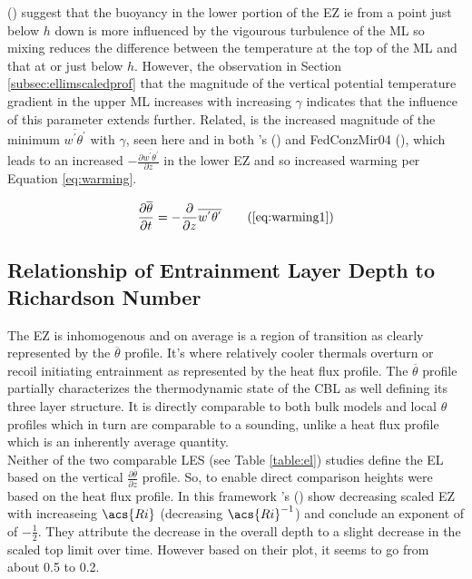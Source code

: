\citeauthor{GarciaMellado} (\cite{GarciaMellado}) suggest that the buoyancy in the lower portion of the \acs{EZ} ie from a point just below $h$ down is more influenced by the vigourous turbulence of the \acs{ML} so mixing reduces the difference between the temperature at the top of the \acs{ML} and that at or just below $h$.  However, the observation in Section \ref{subsec:ellimscaledprof} that the magnitude of the vertical potential temperature gradient in the upper \acs{ML} increases with increasing $\gamma$ indicates that the influence of this parameter extends further.  Related, is the increased magnitude of the minimum $\overline{w^{'}\theta^{'}}$ with $\gamma$, seen here and in both \citeauthor{Sorbjan}'s (\citeyear{Sorbjan}) and {FedConzMir04} (\citeyear{FedConzMir04}), which leads to an increased $-\frac{\partial \overline{w^{'}\theta^{'}}}{\partial z}$ in the lower \acs{EZ} and so increased warming per Equation \ref{eq:warming}.

\begin{equation}
\frac{\partial \overline{\theta}}{\partial t} = -\frac{\partial}{\partial z}\overline{w^{'}\theta^{'}} \tag{\ref{eq:warming1}}
\end{equation}

\subsection{Relationship of Entrainment Layer Depth to Richardson Number}

The \acs{EZ} is inhomogenous and on average is a region of transition as clearly represented by the $\overline{\theta}$ profile.  It's where relatively cooler thermals overturn or recoil initiating entrainment as represented by the heat flux profile.  The $\overline{\theta}$ profile partially characterizes the thermodynamic state of the \acs{CBL} as well defining its three layer structure.  It is directly comparable to both bulk models and local $\theta$ profiles which in turn are comparable to a sounding, unlike a heat flux profile which is an inherently average quantity.\\

Neither of the two comparable \acs{LES} (see Table \ref{table:el}) studies define the \acs{EL} based on the vertical $\frac{\partial \overline{\theta}}{\partial z}$ profile.  So, to enable direct comparison heights were based on the heat flux profile.  In this framework \citeauthor{FedConzMir04}'s (\citeyear{FedConzMir04}) show decreasing scaled \acs{EZ} with increaseing $\acs{Ri }$ (decreasing $\acs{Ri}^{-1}$) and conclude an exponent of of $-\frac{1}{2}$.  They attribute the decrease in the overall depth to a slight decrease in the scaled top limit over time.  However based on their plot, it seems to go from about 0.5 to 0.2.\\

